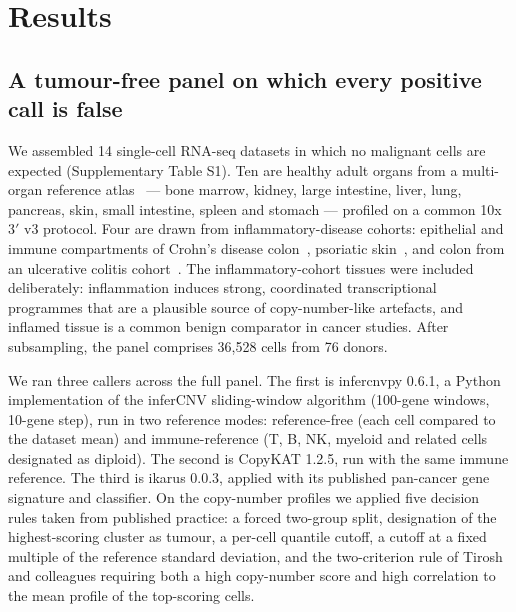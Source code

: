 \documentclass[11pt]{article}
\begin{document}
\section{Results}

\subsection{A tumour-free panel on which every positive call is false}

We assembled 14 single-cell RNA-seq datasets in which no malignant cells are
expected (Supplementary Table S1). Ten are healthy adult organs from a
multi-organ reference atlas~\cite{tabula} --- bone marrow, kidney, large intestine, liver,
lung, pancreas, skin, small intestine, spleen and stomach --- profiled on a
common 10x 3$'$ v3 protocol. Four are drawn from inflammatory-disease
cohorts: epithelial and immune compartments of Crohn's disease
colon~\cite{kong2023}, psoriatic skin~\cite{gao2021pso}, and colon from an
ulcerative colitis cohort~\cite{smillie2019}. The
inflammatory-cohort tissues were included deliberately: inflammation induces
strong, coordinated transcriptional programmes that are a plausible source of
copy-number-like artefacts, and inflamed tissue is a common benign comparator
in cancer studies. After subsampling, the panel comprises 36{,}528 cells from
76 donors.

We ran three callers across the full panel. The first is infercnvpy 0.6.1, a
Python implementation of the inferCNV sliding-window algorithm (100-gene
windows, 10-gene step), run in two reference modes: reference-free (each cell
compared to the dataset mean) and immune-reference (T, B, NK, myeloid and
related cells designated as diploid). The second is CopyKAT 1.2.5, run with
the same immune reference. The third is ikarus 0.0.3, applied with its
published pan-cancer gene signature and classifier. On the
copy-number profiles we applied five decision rules taken from published
practice: a forced two-group split, designation of the highest-scoring
cluster as tumour, a per-cell quantile cutoff, a cutoff at a fixed multiple
of the reference standard deviation, and the two-criterion rule of Tirosh and
colleagues requiring both a high copy-number score and high correlation to
the mean profile of the top-scoring cells.
\end{document}
